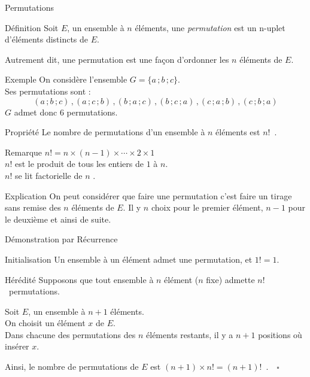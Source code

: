 \documentclass{cours}
\begin{document}
    \begin{Gpartie}{Permutations}
        \begin{Spartie}{Définition}
            Soit $E$, un ensemble à $n$ éléments, une \emph{permutation} est un n-uplet d'éléments distincts de $E$.

            Autrement dit, une permutation est une façon d'ordonner les $n$ éléments de $E$.
            \begin{SSpartie}{Exemple}
                On considère l'ensemble $G=\big\{a\,; b\,; c\big\}$. \\ Ses permutations sont :
                \[(a\,; b\,; c)\,, (a\,; c\,; b)\,, (b\,; a\,; c)\,, (b\,; c\,; a)\,, ( c\,; a\,; b)\,,(c\,; b\,; a)\]
                $G$ admet donc 6 permutations.
            \end{SSpartie}
        \end{Spartie}
        \begin{Spartie}{Propriété}
            Le nombre de permutations d'un ensemble à $n$ éléments est $n!$~.
            \begin{SSpartie}{Remarque}
                $n! =n\times(n-1)\times\dotsb\times 2\times 1$ \\
                $n!$ est le produit de tous les entiers de $1$ à $n$. \\
                $n!$ se lit \og factorielle de $n$ \fg{}.
            \end{SSpartie}
            \begin{SSpartie}{Explication}
                On peut considérer que faire une permutation c'est faire un tirage sans remise des $n$ éléments de $E$. Il y $n$ choix pour le premier élément, $n-1$ pour le deuxième et ainsi de suite.
            \end{SSpartie}
            \begin{SSpartie}{Démonstration par Récurrence}
                \begin{SSSpartie}{Initialisation}
                    Un ensemble à un élément admet une permutation, et $1! =1$.
                \end{SSSpartie}
                \begin{SSSpartie}{Hérédité}
                    Supposons que tout ensemble à $n$ élément ($n$ fixe) admette $n!$~permutations.

                    Soit $E$, un ensemble à $n+1$ éléments. \\
                    On choisit un élément $x$ de $E$. \\
                    Dans chacune des permutations des $n$ éléments restants, il y a $n+1$ positions où insérer $x$.

                    Ainsi, le nombre de permutations de $E$ est $(n+1)\times n! =(n+1)!$~.$\quad\square$
                \end{SSSpartie}
            \end{SSpartie}
        \end{Spartie}
    \end{Gpartie}
\end{document}
